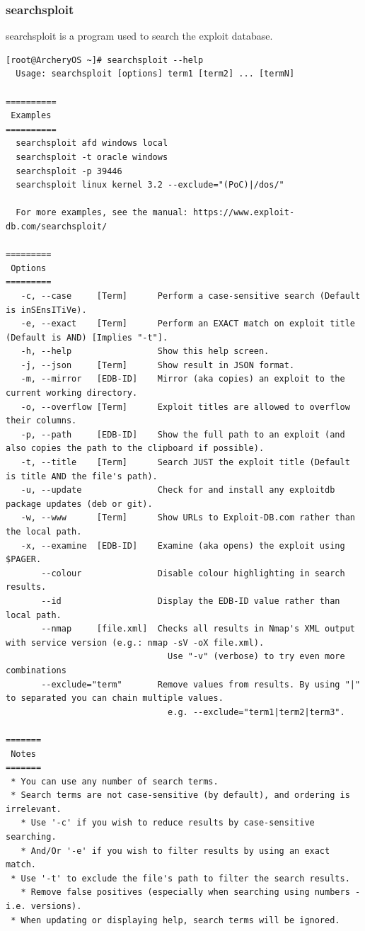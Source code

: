 \documentclass{article}
\begin{document}
\subsubsection{searchsploit}
searchsploit is a program used to search the exploit database.
\begin{lstlisting}
[root@ArcheryOS ~]# searchsploit --help
  Usage: searchsploit [options] term1 [term2] ... [termN]

==========
 Examples 
==========
  searchsploit afd windows local
  searchsploit -t oracle windows
  searchsploit -p 39446
  searchsploit linux kernel 3.2 --exclude="(PoC)|/dos/"

  For more examples, see the manual: https://www.exploit-db.com/searchsploit/

=========
 Options 
=========
   -c, --case     [Term]      Perform a case-sensitive search (Default is inSEnsITiVe).
   -e, --exact    [Term]      Perform an EXACT match on exploit title (Default is AND) [Implies "-t"].
   -h, --help                 Show this help screen.
   -j, --json     [Term]      Show result in JSON format.
   -m, --mirror   [EDB-ID]    Mirror (aka copies) an exploit to the current working directory.
   -o, --overflow [Term]      Exploit titles are allowed to overflow their columns.
   -p, --path     [EDB-ID]    Show the full path to an exploit (and also copies the path to the clipboard if possible).
   -t, --title    [Term]      Search JUST the exploit title (Default is title AND the file's path).
   -u, --update               Check for and install any exploitdb package updates (deb or git).
   -w, --www      [Term]      Show URLs to Exploit-DB.com rather than the local path.
   -x, --examine  [EDB-ID]    Examine (aka opens) the exploit using $PAGER.
       --colour               Disable colour highlighting in search results.
       --id                   Display the EDB-ID value rather than local path.
       --nmap     [file.xml]  Checks all results in Nmap's XML output with service version (e.g.: nmap -sV -oX file.xml).
                                Use "-v" (verbose) to try even more combinations
       --exclude="term"       Remove values from results. By using "|" to separated you can chain multiple values.
                                e.g. --exclude="term1|term2|term3".

=======
 Notes 
=======
 * You can use any number of search terms.
 * Search terms are not case-sensitive (by default), and ordering is irrelevant.
   * Use '-c' if you wish to reduce results by case-sensitive searching.
   * And/Or '-e' if you wish to filter results by using an exact match.
 * Use '-t' to exclude the file's path to filter the search results.
   * Remove false positives (especially when searching using numbers - i.e. versions).
 * When updating or displaying help, search terms will be ignored.
\end{lstlisting}
\end{document}
